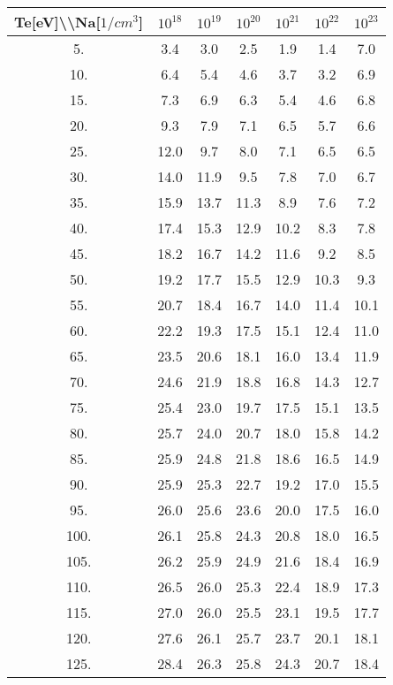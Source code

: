 \begin{tabular}{|c||c|c|c|c|c|c|}
\hline
Te[eV]\textbackslash \textbackslash Na[$1/cm^3$] & $10^{18}$ & $10^{19}$ & $10^{20}$ & $10^{21}$ & $10^{22}$ & $10^{23}$\tabularnewline
\hline
\hline
   5. &     3.4 &     3.0 &     2.5 &     1.9 &     1.4 &     7.0\tabularnewline
\hline
  10. &     6.4 &     5.4 &     4.6 &     3.7 &     3.2 &     6.9\tabularnewline
\hline
  15. &     7.3 &     6.9 &     6.3 &     5.4 &     4.6 &     6.8\tabularnewline
\hline
  20. &     9.3 &     7.9 &     7.1 &     6.5 &     5.7 &     6.6\tabularnewline
\hline
  25. &    12.0 &     9.7 &     8.0 &     7.1 &     6.5 &     6.5\tabularnewline
\hline
  30. &    14.0 &    11.9 &     9.5 &     7.8 &     7.0 &     6.7\tabularnewline
\hline
  35. &    15.9 &    13.7 &    11.3 &     8.9 &     7.6 &     7.2\tabularnewline
\hline
  40. &    17.4 &    15.3 &    12.9 &    10.2 &     8.3 &     7.8\tabularnewline
\hline
  45. &    18.2 &    16.7 &    14.2 &    11.6 &     9.2 &     8.5\tabularnewline
\hline
  50. &    19.2 &    17.7 &    15.5 &    12.9 &    10.3 &     9.3\tabularnewline
\hline
  55. &    20.7 &    18.4 &    16.7 &    14.0 &    11.4 &    10.1\tabularnewline
\hline
  60. &    22.2 &    19.3 &    17.5 &    15.1 &    12.4 &    11.0\tabularnewline
\hline
  65. &    23.5 &    20.6 &    18.1 &    16.0 &    13.4 &    11.9\tabularnewline
\hline
  70. &    24.6 &    21.9 &    18.8 &    16.8 &    14.3 &    12.7\tabularnewline
\hline
  75. &    25.4 &    23.0 &    19.7 &    17.5 &    15.1 &    13.5\tabularnewline
\hline
  80. &    25.7 &    24.0 &    20.7 &    18.0 &    15.8 &    14.2\tabularnewline
\hline
  85. &    25.9 &    24.8 &    21.8 &    18.6 &    16.5 &    14.9\tabularnewline
\hline
  90. &    25.9 &    25.3 &    22.7 &    19.2 &    17.0 &    15.5\tabularnewline
\hline
  95. &    26.0 &    25.6 &    23.6 &    20.0 &    17.5 &    16.0\tabularnewline
\hline
 100. &    26.1 &    25.8 &    24.3 &    20.8 &    18.0 &    16.5\tabularnewline
\hline
 105. &    26.2 &    25.9 &    24.9 &    21.6 &    18.4 &    16.9\tabularnewline
\hline
 110. &    26.5 &    26.0 &    25.3 &    22.4 &    18.9 &    17.3\tabularnewline
\hline
 115. &    27.0 &    26.0 &    25.5 &    23.1 &    19.5 &    17.7\tabularnewline
\hline
 120. &    27.6 &    26.1 &    25.7 &    23.7 &    20.1 &    18.1\tabularnewline
\hline
 125. &    28.4 &    26.3 &    25.8 &    24.3 &    20.7 &    18.4\tabularnewline
\hline
\end{tabular}
